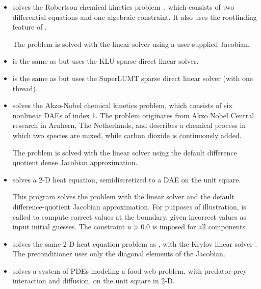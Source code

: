 \begin{itemize}


\item {}
  solves the Robertson chemical kinetics problem~\cite{Rob:66}, which consists
  of two differential equations and one algebraic constraint.  It also uses
  the rootfinding feature of {\idas}.

  The problem is solved with the {\sunlinsoldense} linear solver using
  a user-supplied Jacobian.

\item {}
  is the same as  but uses the KLU sparse direct linear solver.

\item {}
  is the same as  but uses the SuperLUMT sparse direct linear solver
  (with one thread).

\item {}
  solves the Akzo-Nobel chemical kinetics problem, which consists
  of six nonlinear DAEs of index 1. 
  The problem originates from Akzo Nobel Central research in Arnhern,
  The Netherlands, and describes a chemical process in which two
  species are mixed, while carbon dioxide is continuously added.

  The problem is solved with the {\sunlinsoldense} linear solver using the
  default difference quotient dense Jacobian approximation.

\item {}
  solves a 2-D heat equation, semidiscretized to a DAE on the unit square.

  This program solves the problem with the {\sunlinsolband} linear solver and
  the default difference-quotient Jacobian approximation. For purposes of
  illustration,  is called to compute correct values at the
  boundary, given incorrect values as input initial guesses. The constraint
  $u > 0.0$ is imposed for all components.

\item {}
  solves the same 2-D heat equation problem as , with the Krylov
  linear solver {\sunlinsolspgmr}. The preconditioner uses only the diagonal elements
  of the Jacobian.

\item {}
  solves a system of PDEs modeling a food web problem, with predator-prey
  interaction and diffusion, on the unit square in 2-D.


\end{itemize}

